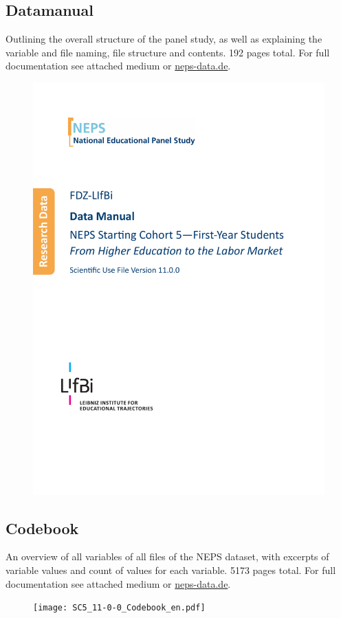 \documentclass[fontsize=12pt]{scrartcl}
\begin{document}
\subsection{Datamanual}
Outlining the overall structure of the panel study, as well as explaining the variable and file naming, file structure and contents. 192 pages total. For full documentation see attached medium or \href{https://www.neps-data.de/en-us/datacenter/dataanddocumentation/startingcohortfirst-yearstudents/documentation.aspx}{neps-data.de}.
\begin{figure}[ht]
	\centering
	\includegraphics[width=.85\textwidth]{SC5_11-0-0_Datamanual.pdf}
\end{figure}
	
\subsection{Codebook}
An overview of all variables of all files of the NEPS dataset, with excerpts of variable values and count of values for each variable. 5173 pages total. For full documentation see attached medium or \href{https://www.neps-data.de/en-us/datacenter/dataanddocumentation/startingcohortfirst-yearstudents/documentation.aspx}{neps-data.de}.
\begin{figure}[ht]
	\centering
	\texttt{[image: SC5\_11-0-0\_Codebook\_en.pdf]}
\end{figure}
% 
\end{document}
